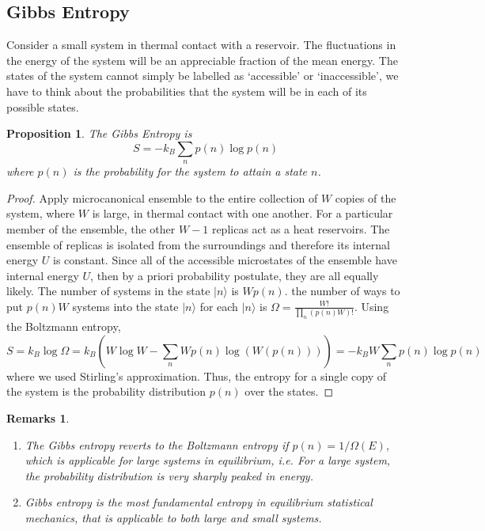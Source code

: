 \documentclass[a4paper]{article}
\newtheorem{remarks}{Remarks}[section]
\theoremstyle{new}
\newtheorem{prop}{Proposition}[section]
\begin{document}
\subsection{Gibbs Entropy}
Consider a small system in thermal contact with a reservoir. The fluctuations in the energy of the system will be an appreciable fraction of the mean energy. The states of the system cannot simply be labelled as `accessible' or `inaccessible', we have to think about the probabilities that the system will be in each of its possible states.
\begin{prop}
The Gibbs Entropy is
\begin{equation}
S=-k_B\sum_np(n)\log p(n)\label{Gibbs}
\end{equation}
where $p(n)$ is the probability for the system to attain a state $n$.
\end{prop}
\begin{proof}
Apply microcanonical ensemble to the entire collection of $W$ copies of the system, where $W$ is large, in thermal contact with one another. For a particular member of the ensemble, the other $W-1$ replicas act as a heat reservoirs. The ensemble of replicas is isolated from the surroundings and therefore its internal energy $U$ is constant. Since all of the accessible microstates of the ensemble have internal energy $U$, then by a priori probability postulate, they are all equally likely. The number of systems in the state $|n\rangle$ is $Wp(n)$. the number of ways to put $p(n)W$ systems into the state $|n\rangle$ for each $|n\rangle$ is $\Omega=\frac{W!}{\prod_n(p(n)W)!}$. Using the Boltzmann entropy,
$$S=k_B\log\Omega=k_B(W\log W-\sum_n Wp(n)\log(W(p(n))))=-k_BW\sum_np(n)\log p(n)$$
where we used Stirling's approximation. Thus, the entropy for a single copy of the system is the probability distribution $p(n)$ over the states.
\end{proof}
\begin{remarks}\leavevmode
\begin{enumerate}
    \item The Gibbs entropy reverts to the Boltzmann entropy if $p(n)=1/\Omega(E)$, which is applicable for large systems in equilibrium, i.e. For a large system, the probability distribution is very sharply peaked in energy.
    \item Gibbs entropy is the most fundamental entropy in equilibrium statistical mechanics, that is applicable to both large and small systems.
\end{enumerate}
\end{remarks}
\end{document}
